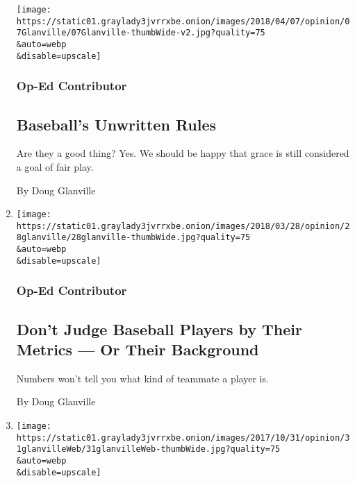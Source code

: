 \begin{enumerate}
  \texttt{[image: https://static01.graylady3jvrrxbe.onion/images/2018/04/07/opinion/07Glanville/07Glanville-thumbWide-v2.jpg?quality=75\\\&auto=webp\\\&disable=upscale]}

  \hypertarget{op-ed-contributor}{%
  \subsubsection{Op-Ed Contributor}\label{op-ed-contributor}}

  \hypertarget{baseballs-unwritten-rules}{%
  \subsection{Baseball's Unwritten
  Rules}\label{baseballs-unwritten-rules}}

  Are they a good thing? Yes. We should be happy that grace is still
  considered a goal of fair play.

  By Doug Glanville
\item
  \href{/2018/03/28/opinion/baseball-season-begins.html}{}

  \texttt{[image: https://static01.graylady3jvrrxbe.onion/images/2018/03/28/opinion/28glanville/28glanville-thumbWide.jpg?quality=75\\\&auto=webp\\\&disable=upscale]}

  \hypertarget{op-ed-contributor-1}{%
  \subsubsection{Op-Ed Contributor}\label{op-ed-contributor-1}}

  \hypertarget{dont-judge-baseball-players-by-their-metrics--or-their-background}{%
  \subsection{Don't Judge Baseball Players by Their Metrics --- Or Their
  Background}\label{dont-judge-baseball-players-by-their-metrics--or-their-background}}

  Numbers won't tell you what kind of teammate a player is.

  By Doug Glanville
\item
  \href{/2017/10/31/opinion/contributors/astros-dodgers-world-series.html}{}

  \texttt{[image: https://static01.graylady3jvrrxbe.onion/images/2017/10/31/opinion/31glanvilleWeb/31glanvilleWeb-thumbWide.jpg?quality=75\\\&auto=webp\\\&disable=upscale]}

  \hypertarget{contributing-op-ed-writer}{%
}
\end{enumerate}
